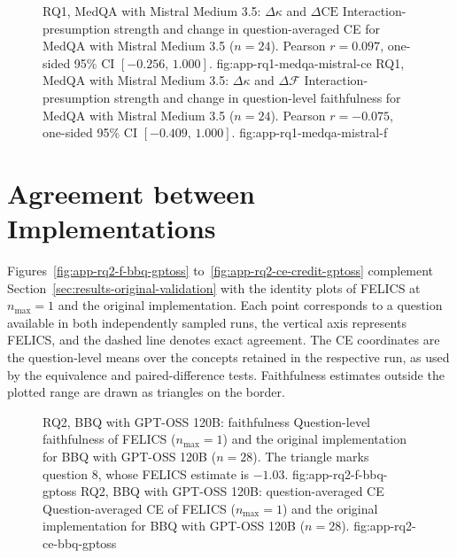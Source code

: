 \begin{figure}[H]
  \centering
    {RQ1, MedQA with Mistral Medium 3.5: $\Delta\kappa$ and $\Delta\mathrm{CE}$}%
    {Interaction-presumption strength and change in question-averaged CE for MedQA with Mistral Medium 3.5 ($n=24$). Pearson $r=0.097$, one-sided 95\% CI $[-0.256,\,1.000]$.}%
    {fig:app-rq1-medqa-mistral-ce}%
  \hfill
    {RQ1, MedQA with Mistral Medium 3.5: $\Delta\kappa$ and $\Delta\mathcal{F}$}%
    {Interaction-presumption strength and change in question-level faithfulness for MedQA with Mistral Medium 3.5 ($n=24$). Pearson $r=-0.075$, one-sided 95\% CI $[-0.409,\,1.000]$.}%
    {fig:app-rq1-medqa-mistral-f}%
\end{figure}

\section{Agreement between Implementations}
\label{app:rq2-identity}

Figures~\ref{fig:app-rq2-f-bbq-gptoss} to~\ref{fig:app-rq2-ce-credit-gptoss} complement Section~\ref{sec:results-original-validation} with the identity plots of FELICS at $n_{\max}=1$ and the original implementation. Each point corresponds to a question available in both independently sampled runs, the vertical axis represents FELICS, and the dashed line denotes exact agreement. The CE coordinates are the question-level means over the concepts retained in the respective run, as used by the equivalence and paired-difference tests. Faithfulness estimates outside the plotted range are drawn as triangles on the border.

\begin{figure}[H]
  \centering
    {RQ2, BBQ with GPT-OSS 120B: faithfulness}%
    {Question-level faithfulness of FELICS ($n_{\max}=1$) and the original implementation for BBQ with GPT-OSS 120B ($n=28$). The triangle marks question 8, whose FELICS estimate is $-1.03$.}%
    {fig:app-rq2-f-bbq-gptoss}%
  \hfill
    {RQ2, BBQ with GPT-OSS 120B: question-averaged CE}%
    {Question-averaged CE of FELICS ($n_{\max}=1$) and the original implementation for BBQ with GPT-OSS 120B ($n=28$).}%
    {fig:app-rq2-ce-bbq-gptoss}%
\end{figure}

